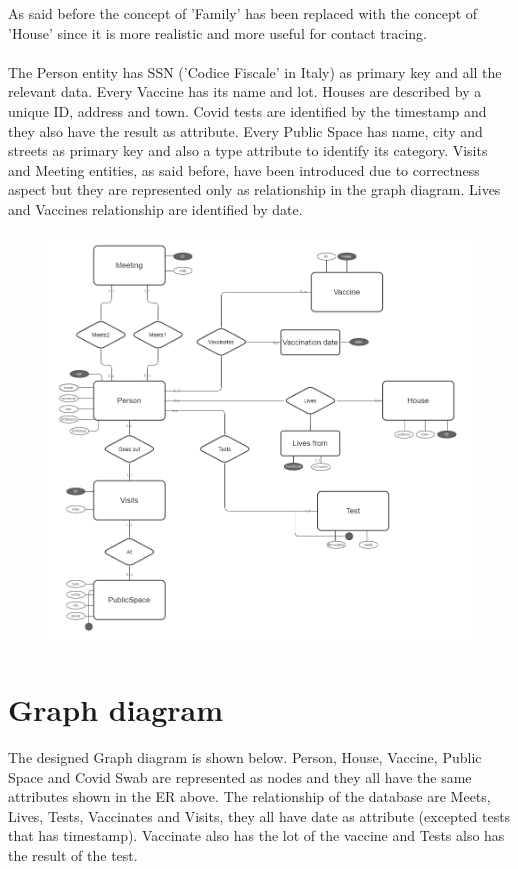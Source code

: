 \documentclass{article}
\begin{document}
As said before the concept of 'Family' has been replaced with the concept of 'House' since it is more realistic and more useful for contact tracing.
\\
\\The Person entity has SSN ('Codice Fiscale' in Italy) as primary key and all the relevant data. Every Vaccine has its name and lot. Houses are described by a unique ID, address and town.
Covid tests are identified by the timestamp and they also have the result as attribute. Every Public Space has name, city and streets as primary key and also a type attribute to identify its category.
Visits and Meeting entities, as said before, have been introduced due to correctness aspect but they are represented only as relationship in the graph diagram. Lives and Vaccines relationship are identified by date.

\begin{figure}[h]
\centering
\includegraphics[scale=0.25]{er.png}
\end{figure}
\newpage

\section{Graph diagram}
The designed Graph diagram is shown below. Person, House, Vaccine, Public Space and Covid Swab are represented as nodes and they all have the same attributes shown in the ER above. The relationship of the database are Meets, Lives, Tests, Vaccinates and Visits, they all have date as attribute (excepted tests that has timestamp). Vaccinate also has the lot of the vaccine and Tests also has the result of the test.
\end{document}
